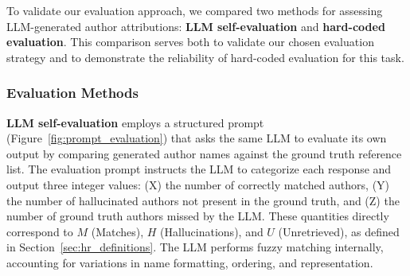 \documentclass[11pt]{article}
\begin{document}
To validate our evaluation approach, we compared two methods for assessing LLM-generated author attributions: \textbf{LLM self-evaluation} and \textbf{hard-coded evaluation}. This comparison serves both to validate our chosen evaluation strategy and to demonstrate the reliability of hard-coded evaluation for this task.

\subsubsection{Evaluation Methods}

\textbf{LLM self-evaluation} employs a structured prompt (Figure~\ref{fig:prompt_evaluation}) that asks the same LLM to evaluate its own output by comparing generated author names against the ground truth reference list. The evaluation prompt instructs the LLM to categorize each response and output three integer values: (X) the number of correctly matched authors, (Y) the number of hallucinated authors not present in the ground truth, and (Z) the number of ground truth authors missed by the LLM. These quantities directly correspond to $M$ (Matches), $H$ (Hallucinations), and $U$ (Unretrieved), as defined in Section~\ref{sec:hr_definitions}. The LLM performs fuzzy matching internally, accounting for variations in name formatting, ordering, and representation.
\end{document}

